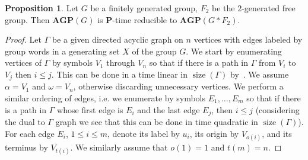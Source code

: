 \documentclass[10pt]{amsart}
\theoremstyle{definition}
\newtheorem{proposition}[theorem]{Proposition}
\DeclareMathOperator{\size}{{size}}
\def\P{{\mathbf{P}}}
\def\AGP{{\mathbf{AGP}}}
\begin{document}
\begin{proposition}\label{pr:agp_to_ssp_star}
Let $G$ be a finitely generated group, $F_2$ be the $2$-generated free group. Then $\AGP(G)$ is $\P$-time reducible to $\AGP(G\ast F_2)$.
\end{proposition}
\begin{proof}
Let $\Gamma$ be a given directed acyclic graph on $n$ vertices with edges labeled by group words in a generating set $X$ of the group $G$. We start by enumerating vertices of $\Gamma$ by symbols $V_1$ through $V_n$ so that if there is a path in $\Gamma$ from $V_i$ to $V_j$ then $i\le j$. This can be done in a time linear in $\size(\Gamma)$ by~\cite{Kahn}. We assume $\alpha=V_1$ and $\omega=V_n$, otherwise discarding unnecessary vertices. We perform a similar ordering of edges, i.e. we enumerate by symbols $E_1,\ldots, E_m$ so that if there is a path in $\Gamma$ whose first edge is $E_i$ and the last edge $E_j$, then $i\le j$ (considering the dual to $\Gamma$ graph we see that this can be done in time quadratic in $\size(\Gamma)$). For each edge $E_i$, $1\le i\le m$, denote its label by $u_i$, its origin by $V_{o(i)}$, and its terminus by $V_{t(i)}$. We similarly assume that $o(1)=1$ and $t(m)=n$.


\end{proof}
\end{document}
